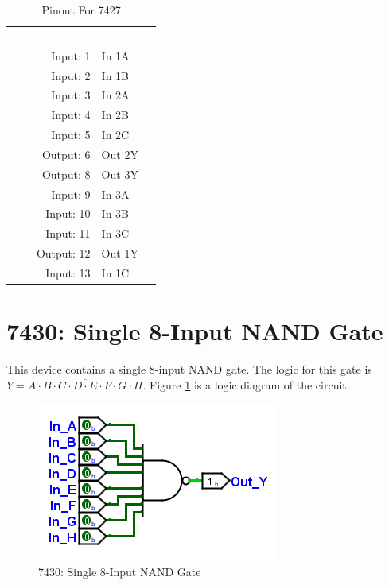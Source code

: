 \begin{table}[H]
	\sffamily
	\newcommand{\head}[1]{\textcolor{white}{\textbf{#1}}}		
	\begin{center}
		\begin{tabular}{rl} 
			\rowcolor{black!75}
			\head{Logisim Label} & \head{Function} \\
			Input: 1   & In 1A  \\
			Input: 2   & In 1B  \\
			Input: 3   & In 2A \\
			Input: 4   & In 2B  \\
			Input: 5   & In 2C  \\
			Output: 6  & Out 2Y \\
			Output: 8  & Out 3Y \\
			Input: 9   & In 3A  \\
			Input: 10  & In 3B  \\
			Input: 11  & In 3C \\
			Output: 12 & Out 1Y  \\
			Input: 13  & In 1C  \\
		\end{tabular}
	\end{center}
	\caption{Pinout For 7427}
	\label{tab:50-7427}
\end{table}

\section{7430: Single 8-Input NAND Gate}

This device contains a single 8-input NAND gate. The logic for this gate is $ Y = \overline{A \cdot B \cdot C \cdot D \cdot E \cdot F \cdot G \cdot H} $. Figure \ref{fig:50-7430} is a logic diagram of the circuit.

\begin{figure}[H]
	\centering
	\includegraphics{gfx/50-7430}
	\caption{7430: Single 8-Input NAND Gate}
	\label{fig:50-7430}
\end{figure}


